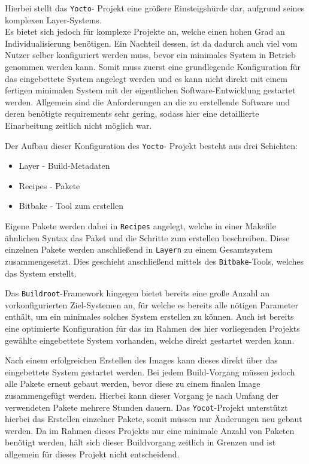 Hierbei stellt das \passthrough{\lstinline!Yocto!}- Projekt eine größere
Einsteigshürde dar, aufgrund seines komplexen Layer-Systems.\\
Es bietet sich jedoch für komplexe Projekte an, welche einen hohen Grad
an Individualisierung benötigen. Ein Nachteil dessen, ist da dadurch
auch viel vom Nutzer selber konfiguriert werden muss, bevor ein
minimales System in Betrieb genommen werden kann. Somit muss zuerst eine
grundlegende Konfiguration für das eingebettete System angelegt werden
und es kann nicht direkt mit einem fertigen minimalen System mit der
eigentlichen Software-Entwicklung gestartet werden. Allgemein sind die
Anforderungen an die zu erstellende Software und deren benötigte
requirements sehr gering, sodass hier eine detaillierte Einarbeitung
zeitlich nicht möglich war.

Der Aufbau dieser Konfiguration des \passthrough{\lstinline!Yocto!}-
Projekt besteht aus drei Schichten:

\begin{itemize}
\tightlist
\item
  Layer - Build-Metadaten
\item
  Recipes - Pakete
\item
  Bitbake - Tool zum erstellen
\end{itemize}

Eigene Pakete werden dabei in \passthrough{\lstinline!Recipes!}
angelegt, welche in einer Makefile ähnlichen Syntax das Paket und die
Schritte zum erstellen beschreiben. Diese einzelnen Pakete werden
anschließend in \passthrough{\lstinline!Layern!} zu einem Gesamtsystem
zusammengesetzt. Dies geschieht anschließend mittels des
\passthrough{\lstinline!Bitbake!}-Tools, welches das System erstellt.

Das \passthrough{\lstinline!Buildroot!}-Framework hingegen bietet
bereits eine große Anzahl an vorkonfigurierten Ziel-Systemen an, für
welche es bereits alle nötigen Parameter enthält, um ein minimales
solches System erstellen zu können. Auch ist bereits eine optimierte
Konfiguration für das im Rahmen des hier vorliegenden Projekts gewählte
eingebettete System vorhanden, welche direkt gestartet werden kann.

Nach einem erfolgreichen Erstellen des Images kann dieses direkt über
das eingebettete System gestartet werden. Bei jedem Build-Vorgang müssen
jedoch alle Pakete erneut gebaut werden, bevor diese zu einem finalen
Image zusammengefügt werden. Hierbei kann dieser Vorgang je nach Umfang
der verwendeten Pakete mehrere Stunden dauern. Das
\passthrough{\lstinline!Yocot!}-Projekt unterstützt hierbei das
Erstellen einzelner Pakete, somit müssen nur Änderungen neu gebaut
werden. Da im Rahmen dieses Projekts nur eine minimale Anzahl von
Paketen benötigt werden, hält sich dieser Buildvorgang zeitlich in
Grenzen und ist allgemein für dieses Projekt nicht entscheidend.

